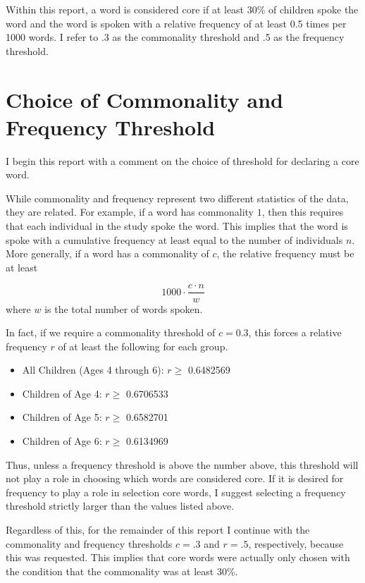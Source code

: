 \documentclass[
]{article}
\begin{document}
Within this report, a word is considered core if at least 30\% of
children spoke the word and the word is spoken with a relative frequency
of at least 0.5 times per 1000 words. I refer to .3 as the commonality
threshold and .5 as the frequency threshold.

\hypertarget{choice-of-commonality-and-frequency-threshold}{%
\section{Choice of Commonality and Frequency
Threshold}\label{choice-of-commonality-and-frequency-threshold}}

I begin this report with a comment on the choice of threshold for
declaring a core word.

While commonality and frequency represent two different statistics of
the data, they are related. For example, if a word has commonality
\(1\), then this requires that each individual in the study spoke the
word. This implies that the word is spoke with a cumulative frequency at
least equal to the number of individuals \(n\). More generally, if a
word has a commonality of \(c\), the relative frequency must be at least

\[1000 \cdot\frac{c\cdot n}{w}\] where \(w\) is the total number of
words spoken.

In fact, if we require a commonality threshold of \(c=0.3\), this forces
a relative frequency \(r\) of at least the following for each group.

\begin{itemize}
\item
  All Children (Ages 4 through 6): \(r \geq\) 0.6482569
\item
  Children of Age 4: \(r \geq\) 0.6706533
\item
  Children of Age 5: \(r \geq\) 0.6582701
\item
  Children of Age 6: \(r \geq\) 0.6134969
\end{itemize}

Thus, unless a frequency threshold is above the number above, this
threshold will not play a role in choosing which words are considered
core. If it is desired for frequency to play a role in selection core
words, I suggest selecting a frequency threshold strictly larger than
the values listed above.

Regardless of this, for the remainder of this report I continue with the
commonality and frequency thresholds \(c=.3\) and \(r=.5\),
respectively, because this was requested. This implies that core words
were actually only chosen with the condition that the commonality was at
least 30\%.
\end{document}

